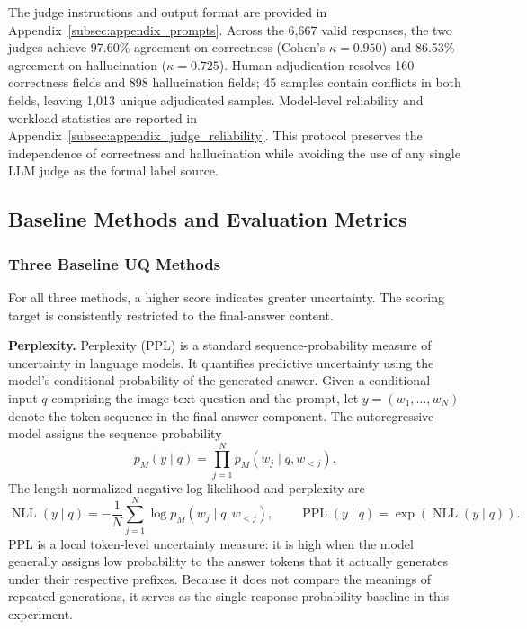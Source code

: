 The judge instructions and output format are provided in Appendix~\ref{subsec:appendix_prompts}. Across the 6,667 valid responses, the two judges achieve 97.60\% agreement on correctness (Cohen's $\kappa=0.950$) and 86.53\% agreement on hallucination ($\kappa=0.725$). Human adjudication resolves 160 correctness fields and 898 hallucination fields; 45 samples contain conflicts in both fields, leaving 1,013 unique adjudicated samples. Model-level reliability and workload statistics are reported in Appendix~\ref{subsec:appendix_judge_reliability}. This protocol preserves the independence of correctness and hallucination while avoiding the use of any single LLM judge as the formal label source.

\subsection{Baseline Methods and Evaluation Metrics}

\subsubsection{Three Baseline UQ Methods}
\label{subsubsec:baseline_uq}

For all three methods, a higher score indicates greater uncertainty. The scoring target is consistently restricted to the final-answer content.

\textbf{Perplexity.} Perplexity (PPL) is a standard sequence-probability measure of uncertainty in language models. It quantifies predictive uncertainty using the model's conditional probability of the generated answer. Given a conditional input $q$ comprising the image-text question and the prompt, let $y=(w_1,\ldots,w_N)$ denote the token sequence in the final-answer component. The autoregressive model assigns the sequence probability
\[
p_M(y\mid q)=\prod_{j=1}^{N}p_M(w_j\mid q,w_{<j}).
\]
The length-normalized negative log-likelihood and perplexity are
\[
\operatorname{NLL}(y\mid q)=-\frac{1}{N}\sum_{j=1}^{N}\log p_M(w_j\mid q,w_{<j}),
\qquad
\operatorname{PPL}(y\mid q)=\exp\!\left(\operatorname{NLL}(y\mid q)\right).
\]
PPL is a local token-level uncertainty measure: it is high when the model generally assigns low probability to the answer tokens that it actually generates under their respective prefixes. Because it does not compare the meanings of repeated generations, it serves as the single-response probability baseline in this experiment.

